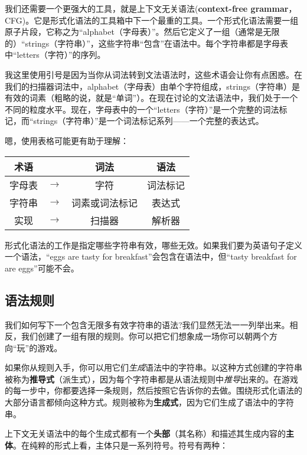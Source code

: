 \documentclass[cn,11pt,chinese]{elegantbook}
\begin{document}
我们还需要一个更强大的工具，就是上下文无关语法(\textbf{context-free grammar}，CFG)。它是形式化语法的工具箱中下一个最重的工具。一个形式化语法需要一组原子片段，它称之为“alphabet（字母表）”。然后它定义了一组（通常是无限的）“strings（字符串）”，这些字符串“包含”在语法中。每个字符串都是字母表中“letters（字符）”的序列。

我这里使用引号是因为当你从词法转到文法语法时，这些术语会让你有点困惑。在我们的扫描器词法中，alphabet（字母表）由单个字符组成，strings（字符串）是有效的词素（粗略的说，就是“单词”）。在现在讨论的文法语法中，我们处于一个不同的粒度水平。现在，字母表中的一个“letters（字符）”是一个完整的词法标记，而“strings（字符串）”是一个词法标记系列——一个完整的表达式。

嗯，使用表格可能更有助于理解：

\begin{center}
  \begin{tabular}{ |c|c|c|c| } 
   \hline
   术语 &  & 词法 & 语法 \\
   \hline 
   字母表 & $\rightarrow$ & 字符 & 词法标记 \\ 
   字符串 & $\rightarrow$ & 词素或词法标记 & 表达式 \\
   实现 & $\rightarrow$ & 扫描器 & 解析器 \\ 
   \hline
  \end{tabular}
\end{center}

形式化语法的工作是指定哪些字符串有效，哪些无效。如果我们要为英语句子定义一个语法，“eggs are tasty for breakfast”会包含在语法中，但“tasty breakfast for are eggs”可能不会。

\subsection{语法规则}

我们如何写下一个包含无限多有效字符串的语法?我们显然无法一一列举出来。相反，我们创建了一组有限的规则。你可以把它们想象成一场你可以朝两个方向“玩”的游戏。

如果你从规则入手，你可以用它们\textit{生成}语法中的字符串。以这种方式创建的字符串被称为\textbf{推导式}（派生式），因为每个字符串都是从语法规则中\textit{推导}出来的。在游戏的每一步中，你都要选择一条规则，然后按照它告诉你的去做。围绕形式化语法的大部分语言都倾向这种方式。规则被称为\textbf{生成式}，因为它们生成了语法中的字符串。

上下文无关语法中的每个生成式都有一个\textbf{头部}（其名称）和描述其生成内容的\textbf{主体}。在纯粹的形式上看，主体只是一系列符号。符号有两种：
\end{document}
